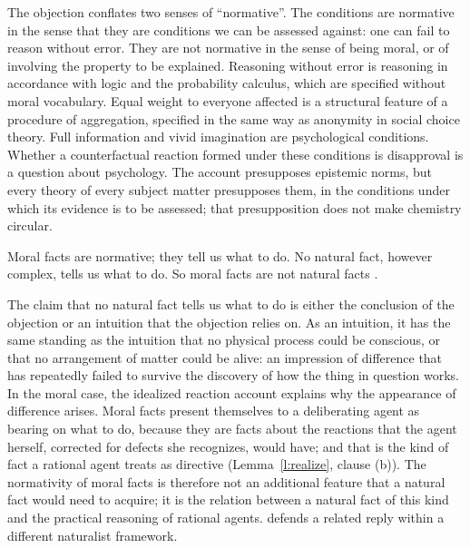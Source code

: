 \documentclass{situationist-preprint}
\begin{document}
\begin{reply}
The objection conflates two senses of \enquote{normative}. The conditions are normative in the sense that they are conditions we can be assessed against: one can fail to reason without error. They are not normative in the sense of being moral, or of involving the property to be explained. Reasoning without error is reasoning in accordance with logic and the probability calculus, which are specified without moral vocabulary. Equal weight to everyone affected is a structural feature of a procedure of aggregation, specified in the same way as anonymity in social choice theory. Full information and vivid imagination are psychological conditions. Whether a counterfactual reaction formed under these conditions is disapproval is a question about psychology. The account presupposes epistemic norms, but every theory of every subject matter presupposes them, in the conditions under which its evidence is to be assessed; that presupposition does not make chemistry circular.
\end{reply}

\begin{objection}
Moral facts are normative; they tell us what to do. No natural fact, however complex, tells us what to do. So moral facts are not natural facts \citep{Enoch2011}.
\end{objection}

\begin{reply}
The claim that no natural fact tells us what to do is either the conclusion of the objection or an intuition that the objection relies on. As an intuition, it has the same standing as the intuition that no physical process could be conscious, or that no arrangement of matter could be alive: an impression of difference that has repeatedly failed to survive the discovery of how the thing in question works. In the moral case, the idealized reaction account explains why the appearance of difference arises. Moral facts present themselves to a deliberating agent as bearing on what to do, because they are facts about the reactions that the agent herself, corrected for defects she recognizes, would have; and that is the kind of fact a rational agent treats as directive (Lemma~\ref{l:realize}, clause (b)). The normativity of moral facts is therefore not an additional feature that a natural fact would need to acquire; it is the relation between a natural fact of this kind and the practical reasoning of rational agents. \citet{Copp2007} defends a related reply within a different naturalist framework.
\end{reply}
\end{document}

